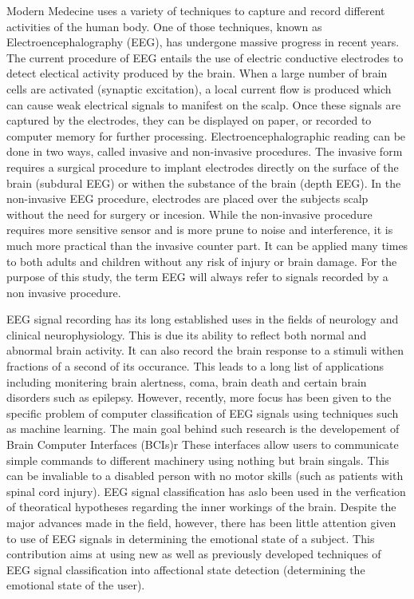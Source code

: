 \documentclass[12pt, a4paper, fleqn]{memoir}%
\begin{document}
Modern Medecine uses a variety of techniques to capture and record different activities of the human body. One of those techniques, known as Electroencephalography (EEG), has undergone massive progress in recent years. The current procedure of EEG entails the use of electric conductive electrodes to detect electical activity produced by the brain. When a large number of brain cells are activated (synaptic excitation), a local current flow is produced which can cause weak electrical signals to manifest on the scalp. Once these signals are captured by the electrodes, they can be displayed on paper, or recorded to computer memory for further processing. Electroencephalographic reading can be done in two ways, called invasive and non-invasive procedures. The invasive form requires a surgical procedure to implant electrodes directly on the surface of the brain (subdural EEG) or withen the substance of the brain (depth EEG). In the non-invasive EEG procedure, electrodes are placed over the subjects scalp without the need for surgery or incesion. While the non-invasive procedure requires more sensitive sensor and is more prune to noise and interference, it is much more practical than the invasive counter part. It can be applied many times to both adults and children without any risk of injury or brain damage\cite{teplan2002fundamentals}. For the purpose of this study, the term EEG will always refer to signals recorded by a non invasive procedure.

EEG signal recording has its long established uses in the fields of neurology and clinical neurophysiology. This is due its ability to reflect both normal and abnormal brain activity. It can also record the brain response to a stimuli withen fractions of a second of its occurance. This leads to a long list of applications including monitering brain alertness, coma, brain death and certain brain disorders such as epilepsy. However, recently, more focus has been given to the specific problem of computer classification of EEG signals using techniques such as machine learning. The main goal behind such research is the developement of Brain Computer Interfaces (BCIs)r These interfaces allow users to communicate simple commands to different machinery using nothing but brain singals. This can be invaliable to a disabled person with no motor skills (such as patients with spinal cord injury). EEG signal classification has aslo been used in the verfication of theoratical hypotheses regarding the inner workings of the brain. Despite the major advances made in the field, however, there has been little attention given to use of EEG signals in determining the emotional state of a subject. This contribution aims at using new as well as previously developed techniques of EEG signal classification into affectional state detection (determining the emotional state of the user). 
\end{document}
